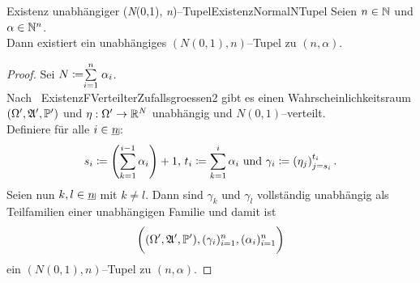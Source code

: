 \begin{korollar}{Existenz unabhängiger (\textsl N(0,1),
\textsl n)--Tupel}{ExistenzNormalNTupel}
Seien $n \in \N$ und $\alpha \in \N^n$.\\
Dann existiert ein unabhängiges $(N(0,1),n)$--Tupel zu $(n, \alpha)$.
\end{korollar}
\begin{proof}
Sei $N\coloneqq  \Sum{i=1}n \alpha_i$.\\
Nach~
{ExistenzFVerteilterZufallsgroessen2} gibt es einen Wahrscheinlichkeitsraum
$(\Omega', \mfa', \Prim')$ und $\eta: \Omega' \rightarrow \R^N$ unabhängig und
$N(0,1)$--verteilt.\\
Definiere für alle $i \in \haken n$:
\[s_i \coloneqq  \left(\sum_{k=1}^{i-1}\alpha_i\right)+1\text{, }
  t_i \coloneqq  \sum_{k=1}^{i}\alpha_i \text{ und }
 \gamma_i\coloneqq \left(\eta_j \right)_{j = s_i}^{t_i}\text.\]
Seien nun $k, l \in \haken n$ mit $k \neq l$. Dann sind $\gamma_k$ und
$\gamma_l$ vollständig unabhängig als Teilfamilien einer unabhängigen Familie
und damit ist \[\bigg((\Omega',\mfa',\Prim'),(\gamma_i)_{i=1}^n, (\alpha_i)_{i=1}^n\bigg)\]
ein $(N(0,1),n)$--Tupel zu $(n, \alpha)$.
\end{proof}